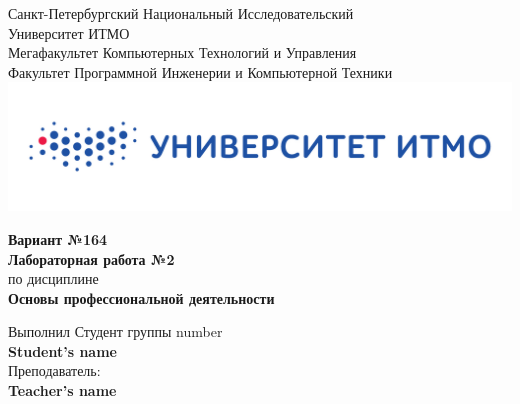 \documentclass[12pt,onecolumn]{article}
\begin{document}
\setcounter{tocdepth}{4}
\begin{center}
    Санкт-Петербургский Национальный Исследовательский\\ 
    Университет ИТМО\\
    Мегафакультет Компьютерных Технологий и Управления\\
    Факультет Программной Инженерии и Компьютерной Техники \\
    \includegraphics[scale=0.3]{itm.jpg} %
\end{center}
\vspace{1cm}


\begin{center}
    \large \textbf{Вариант №164}\\
    \textbf{Лабораторная работа №2}\\
    по дисциплине\\
    \textbf{Основы профессиональной деятельности}
\end{center}

\vspace{2cm}

\begin{flushright}
  Выполнил Студент  группы number\\
  \textbf{Student's name}\\
  Преподаватель: \\
  \textbf{Teacher's name}\\
\end{flushright}
\end{document}
